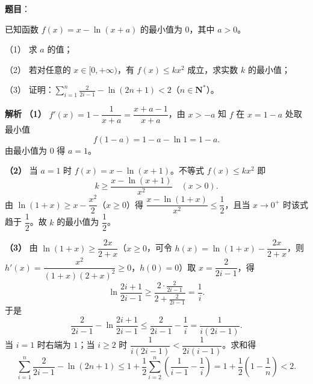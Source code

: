 \begin{answer}

\textbf{题目}：

已知函数 $f(x)=x-\ln(x+a)$ 的最小值为 $0$，其中 $a>0$。

（1） 求 $a$ 的值；

（2） 若对任意的 $x\in[0,+\infty)$，有 $f(x)\leqslant kx^2$ 成立，求实数 $k$ 的最小值；

（3） 证明：$\displaystyle\sum_{i=1}^{n}\frac{2}{2i-1}-\ln(2n+1)<2$（$n\in\mathbf N^*$）。

\textbf{解析}
\textbf{（1）} $f'(x)=1-\dfrac1{x+a}=\dfrac{x+a-1}{x+a}$，由 $x>-a$ 知 $f$ 在 $x=1-a$ 处取最小值
\nopagebreak[4]
\[f(1-a)=1-a-\ln1=1-a.\]
由最小值为 $0$ 得 $a=1$。

\textbf{（2）} 当 $a=1$ 时 $f(x)=x-\ln(x+1)$。不等式 $f(x)\leqslant kx^2$ 即
\nopagebreak[4]
\[k\geqslant\frac{x-\ln(x+1)}{x^2}\quad(x>0).\]
由 $\ln(1+x)\geqslant x-\dfrac{x^2}2$（$x\geqslant0$）得 $\dfrac{x-\ln(1+x)}{x^2}\leqslant\dfrac12$，且当 $x\to0^+$ 时该式趋于 $\dfrac12$。故 $k$ 的最小值为 $\dfrac12$。

\textbf{（3）} 由 $\ln(1+x)\geqslant\dfrac{2x}{2+x}$（$x\geqslant0$，可令 $h(x)=\ln(1+x)-\dfrac{2x}{2+x}$，则 $h'(x)=\dfrac{x^2}{(1+x)(2+x)^2}\geqslant0$，$h(0)=0$）取 $x=\dfrac2{2i-1}$，得
\nopagebreak[4]
\[\ln\frac{2i+1}{2i-1}\geqslant\frac{2\cdot\frac2{2i-1}}{2+\frac2{2i-1}}=\frac1i.\]
于是
\nopagebreak[4]
\[\frac2{2i-1}-\ln\frac{2i+1}{2i-1}\leqslant\frac2{2i-1}-\frac1i=\frac1{i(2i-1)}.\]
当 $i=1$ 时右端为 $1$；当 $i\geqslant2$ 时 $\dfrac1{i(2i-1)}<\dfrac1{2i(i-1)}$。求和得
\nopagebreak[4]
\[\sum_{i=1}^n\frac2{2i-1}-\ln(2n+1)\leqslant1+\frac12\sum_{i=2}^n\left(\frac1{i-1}-\frac1i\right)=1+\frac12\left(1-\frac1n\right)<2.\]




\end{answer}